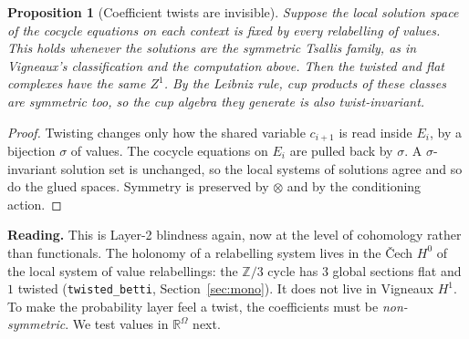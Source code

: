 \documentclass[11pt]{article}
\newtheorem{proposition}[theorem]{Proposition}
\theoremstyle{definition}
\theoremstyle{remark}
\newcommand{\Z}{\mathbb{Z}}
\newcommand{\R}{\mathbb{R}}
\begin{document}
\begin{proposition}[Coefficient twists are invisible]\label{prop:twistinv}
Suppose the local solution space of the cocycle equations on each context is fixed by every relabelling of values. This holds whenever the solutions are the symmetric Tsallis family, as in Vigneaux's classification and the computation above. Then the twisted and flat complexes have the same $Z^1$. By the Leibniz rule, cup products of these classes are symmetric too, so the cup algebra they generate is also twist-invariant.
\end{proposition}
\begin{proof}
Twisting changes only how the shared variable $c_{i+1}$ is read inside $E_i$, by a bijection $\sigma$ of values. The cocycle equations on $E_i$ are pulled back by $\sigma$. A $\sigma$-invariant solution set is unchanged, so the local systems of solutions agree and so do the glued spaces. Symmetry is preserved by $\otimes$ and by the conditioning action.
\end{proof}

\textbf{Reading.} This is Layer-2 blindness again, now at the level of cohomology rather than functionals. The holonomy of a relabelling system lives in the \v{C}ech $H^0$ of the local system of value relabellings: the $\Z/3$ cycle has $3$ global sections flat and $1$ twisted (\texttt{twisted\_betti}, Section~\ref{sec:mono}). It does not live in Vigneaux $H^1$. To make the probability layer feel a twist, the coefficients must be \emph{non-symmetric}. We test values in $\R^{\Omega}$ next.
\end{document}
